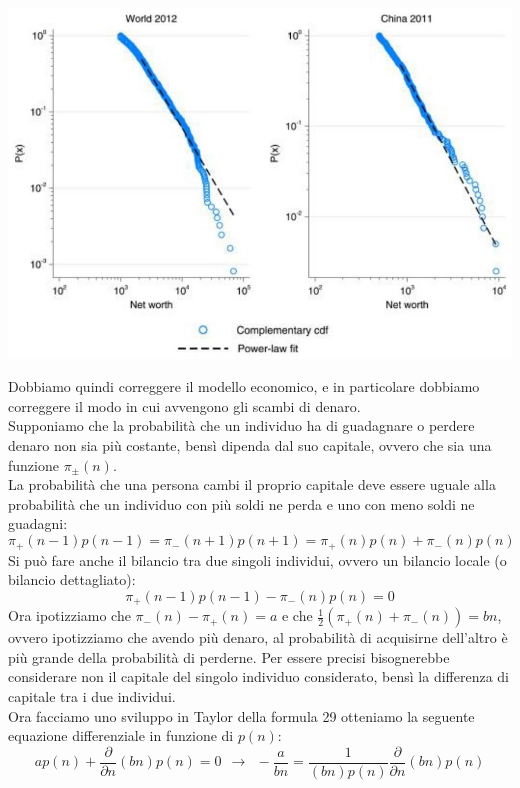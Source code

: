 \documentclass[12pt]{article}
\begin{document}
\begin{center}
	\includegraphics[scale=.65]{Income distribution}
\end{center}
Dobbiamo quindi correggere il modello economico, e in particolare dobbiamo correggere il modo in cui avvengono gli scambi di denaro. \\
Supponiamo che la probabilità che un individuo ha di guadagnare o perdere denaro non sia più costante, bensì dipenda dal suo capitale, ovvero che sia una funzione $\pi_{\pm}(n)$. \\
La probabilità che una persona cambi il proprio capitale deve essere uguale alla probabilità che un individuo con più soldi ne perda e uno con meno soldi ne guadagni:
\begin{equation}
	\pi_+(n-1)p(n-1) = \pi_-(n+1)p(n+1) = \pi_+ (n)p(n)+ \pi_-(n)p(n)
\end{equation}
Si può fare anche il bilancio tra due singoli individui, ovvero un bilancio locale (o bilancio dettagliato):
\begin{equation}
	\pi_+(n-1)p(n-1) - \pi_-(n)p(n) = 0
\end{equation}
Ora ipotizziamo che $\pi_-(n)-\pi_+(n) = a$ e che $\frac{1}{2}(\pi_+(n)+\pi_-(n)) = bn$, ovvero ipotizziamo che avendo più denaro, al probabilità di acquisirne dell'altro è più grande della probabilità di perderne. Per essere precisi bisognerebbe considerare non il capitale del singolo individuo considerato, bensì la differenza di capitale tra i due individui. \\
Ora facciamo uno sviluppo in Taylor della formula 29 otteniamo la seguente equazione differenziale in funzione di $p(n)$:
$$
	ap(n)+\frac{\partial}{\partial n}(bn)p(n) = 0 \ \ \longrightarrow \ \  -\frac{a}{bn} = \frac{1}{(bn)p(n)}\frac{\partial}{\partial n}(bn)p(n)
$$
\end{document}
